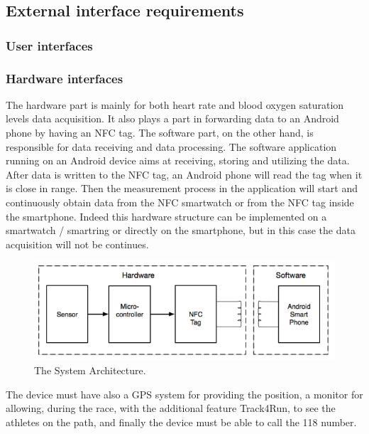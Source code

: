 \subsection{External interface requirements}
\subsubsection{User interfaces}

\subsubsection{Hardware interfaces}
The hardware part is mainly for both heart rate and blood oxygen saturation levels data acquisition. It also plays a part in forwarding data to an Android phone by having an NFC tag. The software part, on the other hand, is responsible for data receiving and data processing. The software application running on an Android device aims at receiving, storing and utilizing the data. After data is written to the NFC tag, an Android phone will read the tag when it is close in range. Then the measurement process in the application will start and continuously obtain data from the NFC smartwatch or from the NFC tag inside the smartphone. Indeed this hardware structure can be implemented on a smartwatch / smartring or directly on the smartphone, but in this case the data acquisition will not be continues.
\begin{figure}[h!]
  \includegraphics[width=\linewidth]{Images/hardware}
  \caption{The System Architecture.}
  \label{fig:The System Architecture}
\end{figure} 
The device must have also a GPS system for providing the position, a monitor for allowing, during the race, with the additional feature Track4Run, to see the athletes on the path, and finally the device must be able to call the 118 number.  
